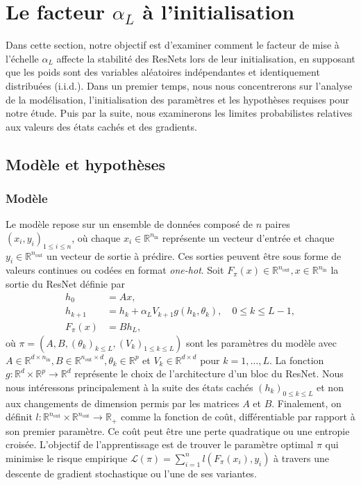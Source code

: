 \chapter{Le facteur $\alpha_L$ à l'initialisation}
Dans cette section, notre objectif est d'examiner comment le facteur de mise à l'échelle $\alpha_L$ affecte la stabilité des ResNets lors de leur initialisation, en supposant que les poids sont des variables aléatoires indépendantes et identiquement distribuées (i.i.d.). Dans un premier temps, nous nous concentrerons sur l'analyse de la modélisation, l'initialisation des paramètres et les hypothèses requises pour notre étude. Puis par la suite, nous examinerons les limites probabilistes relatives aux valeurs des états cachés et des gradients.

\section{Modèle et hypothèses}
\subsection*{Modèle}
Le modèle repose sur un ensemble de données composé de $n$ paires $(x_i, y_i)_{1 \leqslant i \leqslant n}$, où chaque $x_i \in \mathbb{R}^{n_{\text{in}}}$ représente un vecteur d'entrée et chaque $y_i \in \mathbb{R}^{n_{\text{out}}}$ un vecteur de sortie à prédire. Ces sorties peuvent être sous forme de valeurs continues ou codées en format \textit{one-hot}. Soit $F_\pi(x) \in \mathbb{R}^{n_{\text{out}}}, x \in \mathbb{R}^{n_{\text{in}}}$ la sortie du ResNet définie par 
\begin{align}\label{ResNet_equation}
    h_0 &= Ax, \nonumber\\
    h_{k+1} &= h_k + \alpha_L V_{k+1}g(h_k, \theta_k), \quad 0 \leqslant k \leqslant L - 1, \\
    F_{\pi}(x) &= Bh_L, \nonumber
\end{align}
où $\pi = (A, B, (\theta_k)_{k \leqslant L}, (V_k)_{1 \leqslant k \leqslant L})$ sont les paramètres du modèle avec $A \in \mathbb{R}^{d \times n_{\text{in}}}, B \in \mathbb{R}^{n_{\text{out}} \times d}, \theta_k \in \mathbb{R}^p$ et $V_k \in \mathbb{R}^{d \times d}$ pour $k = 1, \ldots, L$. La fonction $g : \mathbb{R}^d \times \mathbb{R}^p \to \mathbb{R}^d$ représente le choix de l'architecture d'un bloc du ResNet. Nous nous intéressons principalement à la suite des états cachés $(h_k)_{0 \leqslant k \leqslant L}$ et non aux changements de dimension permis par les matrices $A$ et $B$.
Finalement, on définit $l: \mathbb{R}^{n_{\text{out}}} \times \mathbb{R}^{n_{\text{out}}} \to \mathbb{R}_+$ comme la fonction de coût, différentiable par rapport à son premier paramètre. Ce coût peut être une perte quadratique ou une entropie croisée. L'objectif de l'apprentissage est de trouver le paramètre optimal $\pi$ qui minimise le risque empirique $\mathscr{L}(\pi) = \sum_{i=1}^{n} l(F_\pi(x_i), y_i)$ à travers une descente de gradient stochastique ou l'une de ses variantes.

